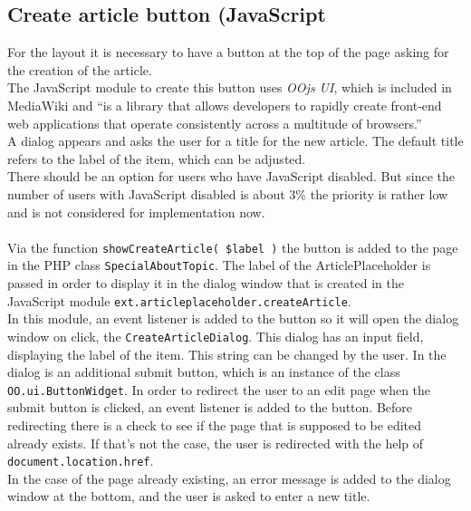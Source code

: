 \subsection{Create article button (JavaScript}
		
For the layout it is necessary to have a button at the top of the page asking for the creation of the article. \\
The JavaScript module to create this button uses \textit{OOjs UI}, which is included in MediaWiki and ``is a library that allows developers to rapidly create front-end web applications that operate consistently across a multitude of browsers.'' \citep{wiki:27} \\
A dialog appears and asks the user for a title for the new article. The default title refers to the label of the item, which can be adjusted. \\
There should be an option for users who have JavaScript disabled. But since the number of users with JavaScript disabled is about 3\% \citep{wiki:02} the priority is rather low and is not considered for implementation now. \\
\\
Via the function \texttt{\justify showCreateArticle( \$label )} the button is added to the page in the PHP class \texttt{\justify SpecialAboutTopic}. The label of the ArticlePlaceholder is passed in order to display it in the dialog window that is created in the JavaScript module \texttt{\justify ext.articleplaceholder.createArticle}. \\
In this module, an event listener is added to the button so it will open the dialog window on click, the \texttt{CreateArticleDialog}. This dialog has an input field, displaying the label of the item. This string can be changed by the user. In the dialog is an additional submit button, which is an instance of the class \texttt{OO.ui.ButtonWidget}. In order to redirect the user to an edit page when the submit button is clicked, an event listener is added to the button. Before redirecting there is a check to see if the page that is supposed to be edited already exists. If that's not the case, the user is redirected with the help of \texttt{\justify document.location.href}. \\
In the case of the page already existing, an error message is added to the dialog window at the bottom, and the user is asked to enter a new title.